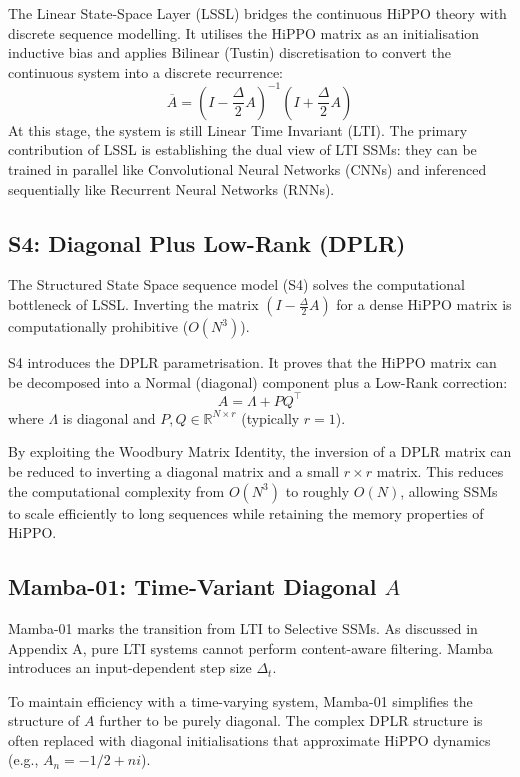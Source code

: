\documentclass[a4paper,11pt]{article}
\begin{document}
The Linear State-Space Layer (LSSL) bridges the continuous HiPPO theory with discrete sequence modelling. It utilises the HiPPO matrix as an initialisation inductive bias and applies Bilinear (Tustin) discretisation to convert the continuous system into a discrete recurrence:
\begin{equation}
    \overline{A} = (I - \frac{\Delta}{2}A)^{-1}(I + \frac{\Delta}{2}A)
\end{equation}
At this stage, the system is still Linear Time Invariant (LTI). The primary contribution of LSSL is establishing the dual view of LTI SSMs: they can be trained in parallel like Convolutional Neural Networks (CNNs) and inferenced sequentially like Recurrent Neural Networks (RNNs).

\subsection{S4: Diagonal Plus Low-Rank (DPLR)}

The Structured State Space sequence model (S4) solves the computational bottleneck of LSSL. Inverting the matrix $(I - \frac{\Delta}{2}A)$ for a dense HiPPO matrix is computationally prohibitive ($O(N^3)$).

S4 introduces the DPLR parametrisation. It proves that the HiPPO matrix can be decomposed into a Normal (diagonal) component plus a Low-Rank correction:
\begin{equation}
    A = \Lambda + PQ^\top
\end{equation}
where $\Lambda$ is diagonal and $P, Q \in \mathbb{R}^{N \times r}$ (typically $r=1$).

By exploiting the Woodbury Matrix Identity, the inversion of a DPLR matrix can be reduced to inverting a diagonal matrix and a small $r \times r$ matrix. This reduces the computational complexity from $O(N^3)$ to roughly $O(N)$, allowing SSMs to scale efficiently to long sequences while retaining the memory properties of HiPPO.

\subsection{Mamba-01: Time-Variant Diagonal $A$}

Mamba-01 marks the transition from LTI to Selective SSMs. As discussed in Appendix A, pure LTI systems cannot perform content-aware filtering. Mamba introduces an input-dependent step size $\Delta_t$.

To maintain efficiency with a time-varying system, Mamba-01 simplifies the structure of $A$ further to be purely diagonal. The complex DPLR structure is often replaced with diagonal initialisations that approximate HiPPO dynamics (e.g., $A_n = -1/2 + ni$).
\end{document}
